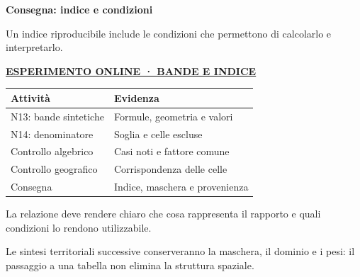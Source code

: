 \documentclass[12pt,aspectratio=1610]{beamer}
\newcommand{\PBody}[1]{\par{\fontsize{11.3}{14.8}\selectfont #1\par}}
\newcommand{\PSmall}[1]{\par{\fontsize{9.8}{13.1}\selectfont #1\par}}
\newcommand{\PInfo}[1]{%
\begin{tcolorbox}[enhanced,arc=1.6mm,boxrule=.55pt,colback=GeoTint,
 colframe=Rule!80!Classical,left=2.3mm,right=2.3mm,top=2mm,bottom=2mm,
 before skip=1mm,after skip=1mm]
\PSmall{#1}\end{tcolorbox}}
\newcommand{\PLab}[2]{\par{\color{Classical}\bfseries\fontsize{9}{11}\selectfont
\href{#1}{\MakeUppercase{#2}}}\par\vspace{1.8mm}}
\begin{document}
\begin{frame}[plain]\hypertarget{slide90}{}
\begin{lrbox}{\TitleBox}
\begin{minipage}[t]{17.7cm}\raggedright\color{Ink}\fontsize{11.3}{14.8}\selectfont
\color{Navy}\bfseries\fontsize{20.6}{24.5}\selectfont Consegna: indice e condizioni
\end{minipage}\end{lrbox}

\begin{lrbox}{\RecallBox}
\begin{minipage}[t]{14.3cm}\raggedright\color{Ink}\fontsize{11.3}{14.8}\selectfont
\fontsize{10.3}{13.8}\selectfont Un indice riproducibile include le condizioni che permettono di calcolarlo e interpretarlo.
\end{minipage}\end{lrbox}

\begin{lrbox}{\PilotLeftBox}
\begin{minipage}[t]{10.05cm}\raggedright\color{Ink}\fontsize{11.3}{14.8}\selectfont
\PLab{https://marzione00.github.io/Lab_Geo/\#laboratorio/m12-indici}{Esperimento online · bande e indice}
{\fontsize{10.2}{13.1}\selectfont\renewcommand{\arraystretch}{1.45}\begin{tabular}{@{}p{4.3cm}p{4.7cm}@{}}\toprule
\textbf{Attività} & \textbf{Evidenza}\\\midrule
N13: bande sintetiche & Formule, geometria e valori\\
N14: denominatore & Soglia e celle escluse\\
Controllo algebrico & Casi noti e fattore comune\\
Controllo geografico & Corrispondenza delle celle\\
Consegna & Indice, maschera e provenienza\\
\bottomrule\end{tabular}}

\end{minipage}\end{lrbox}

\begin{lrbox}{\PilotRightBox}
\begin{minipage}[t]{7.55cm}\raggedright\color{Ink}\fontsize{11.3}{14.8}\selectfont
\PBody{La relazione deve rendere chiaro che cosa rappresenta il rapporto e quali condizioni lo rendono utilizzabile.}
\vspace{2.5mm}
\PInfo{Le sintesi territoriali successive conserveranno la maschera, il dominio e i pesi: il passaggio a una tabella non elimina la struttura spaziale.}


\end{minipage}
\end{lrbox}
\end{frame}
\end{document}
